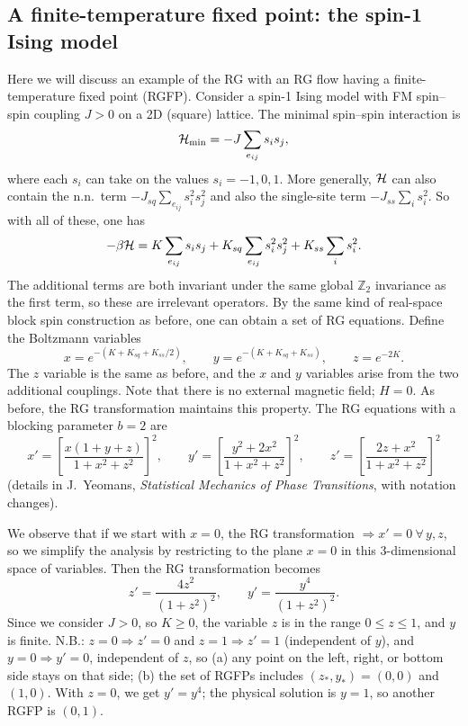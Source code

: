 \subsection{A finite-temperature fixed point: the spin-1 Ising model}

Here we will discuss an example of the RG with an RG flow having a finite-temperature fixed point (RGFP).
Consider a spin-1 Ising model with FM spin--spin coupling $J>0$ on a 2D (square) lattice. The minimal
spin--spin interaction is
\begin{equation}
  \mathcal{H}_{\min} = -J\sum_{e_{ij}}s_is_j,
\end{equation}
where each $s_i$ can take on the values $s_i = -1,0,1$. More generally, $\mathcal{H}$ can also contain the n.n.\
term $-J_{sq}\sum_{e_{ij}}s_i^2s_j^2$ and also the single-site term $-J_{ss}\sum_is_i^2$. So with all of
these, one has
\begin{equation}
  -\beta\mathcal{H} = K\sum_{e_{ij}}s_is_j + K_{sq}\sum_{e_{ij}}s_i^2s_j^2 + K_{ss}\sum_is_i^2 .
\end{equation}
The additional terms are both invariant under the same global $\mathbb{Z}_2$ invariance as the first term,
so these are irrelevant operators. By the same kind of real-space block spin construction as before, one
can obtain a set of RG equations. Define the Boltzmann variables
\begin{equation}
  x = e^{-(K+K_{sq}+K_{ss}/2)},\qquad y = e^{-(K+K_{sq}+K_{ss})},\qquad z = e^{-2K}.
\end{equation}
The $z$ variable is the same as before, and the $x$ and $y$ variables arise from the two additional
couplings. Note that there is no external magnetic field; $H = 0$. As before, the RG transformation
maintains this property. The RG equations with a blocking parameter $b = 2$ are
\begin{equation}
  x' = \left[\frac{x(1+y+z)}{1+x^2+z^2}\right]^2,\qquad
  y' = \left[\frac{y^2+2x^2}{1+x^2+z^2}\right]^2,\qquad
  z' = \left[\frac{2z+x^2}{1+x^2+z^2}\right]^2
\end{equation}
(details in J.~Yeomans, \emph{Statistical Mechanics of Phase Transitions}, with notation changes).

We observe that if we start with $x = 0$, the RG transformation $\Rightarrow x' = 0\ \forall\,y,z$, so we
simplify the analysis by restricting to the plane $x = 0$ in this 3-dimensional space of variables. Then the
RG transformation becomes
\begin{equation}
  z' = \frac{4z^2}{(1+z^2)^2},\qquad y' = \frac{y^4}{(1+z^2)^2}.
\end{equation}
Since we consider $J>0$, so $K\ge 0$, the variable $z$ is in the range $0\le z\le 1$, and $y$ is finite.
N.B.: $z = 0\Rightarrow z' = 0$ and $z = 1\Rightarrow z' = 1$ (independent of $y$), and
$y = 0\Rightarrow y' = 0$, independent of $z$, so (a) any point on the left, right, or bottom side stays on
that side; (b) the set of RGFPs includes $(z_*,y_*) = (0,0)$ and $(1,0)$. With $z = 0$, we get $y' = y^4$;
the physical solution is $y = 1$, so another RGFP is $(0,1)$.

